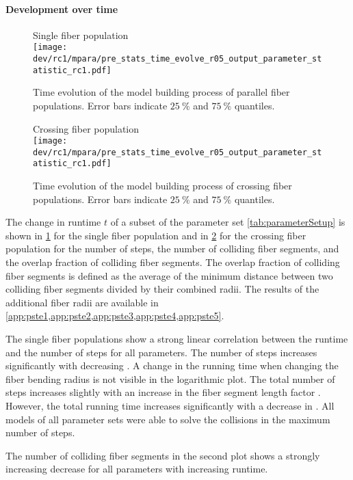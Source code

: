 \paragraph{Development over time}
%
\begin{figure}[p]
\centering
Single fiber population\\[0em]
\texttt{[image: dev/rc1/mpara/pre\_stats\_time\_evolve\_r05\_output\_parameter\_statistic\_rc1.pdf]}
\caption{Time evolution of the model building process of parallel fiber populations. Error bars indicate $\SI{25}{\percent}$ and $\SI{75}{\percent}$ quantiles.}
\label{fig:timeDevelopmentNone}
\end{figure}
%
\begin{figure}[p]
\centering
Crossing fiber population\\[0ex]
\texttt{[image: dev/rc1/mpara/pre\_stats\_time\_evolve\_r05\_output\_parameter\_statistic\_rc1.pdf]}
\caption{Time evolution of the model building process of crossing fiber populations. Error bars indicate $\SI{25}{\percent}$ and $\SI{75}{\percent}$ quantiles.}
\label{fig:timeDevelopmentCross}
\end{figure}
%
The change in runtime $t$ of a subset of the parameter set \cref{tab:parameterSetup} is shown in \cref{fig:timeDevelopmentNone} for the single fiber population and in \cref{fig:timeDevelopmentCross} for the crossing fiber population for the number of steps, the number of colliding fiber segments, and the overlap fraction of colliding fiber segments.
The overlap fraction of colliding fiber segments is defined as the average of the minimum distance between two colliding fiber segments divided by their combined radii.
The results of the additional fiber radii are available in \cref{app:pste1,app:pste2,app:pste3,app:pste4,app:pste5}.
\par
%
The single fiber populations show a strong linear correlation between the runtime and the number of steps for all parameters.
The number of steps increases significantly with decreasing \segLengthFactor{}.
A change in the running time when changing the fiber bending radius \segRadiusFactor{} is not visible in the logarithmic plot.
The total number of steps increases slightly with an increase in the fiber segment length factor \segLengthFactor{}.
However, the total running time increases significantly with a decrease in \segLengthFactor{}.
All models of all parameter sets were able to solve the collisions in the maximum number of steps.
\par
%
The number of colliding fiber segments in the second plot shows a strongly increasing decrease for all parameters with increasing runtime.
